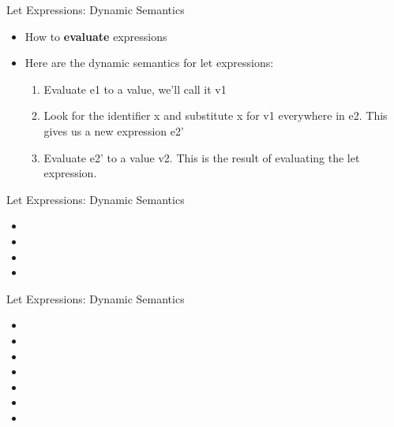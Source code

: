 \documentclass{beamer}
\begin{document}
    \begin{frame}{Let Expressions: Dynamic Semantics}
        \begin{itemize}
            \item How to \textbf{evaluate} expressions
            \item Here are the dynamic semantics for let expressions:
            \begin{enumerate}
                \item Evaluate e1 to a value, we'll call it v1
                \item Look for the identifier x and substitute x for v1 everywhere in e2. This gives us a new expression e2'
                \item Evaluate e2' to a value v2. This is the result of evaluating the let expression.
            \end{enumerate}
        \end{itemize}
    \end{frame}
    
    \begin{frame}{Let Expressions: Dynamic Semantics}
        \begin{itemize}
            \item {}
            \item {}
            \item {}
            \item {}
        \end{itemize} 
    \end{frame}
    
    \begin{frame}{Let Expressions: Dynamic Semantics}
        \begin{itemize}
            \item {}
            \item {}
            \item {}
            \item {}
            \item {}
            \item {}
            \item {}
        \end{itemize} 
    \end{frame}
    
\end{document}
